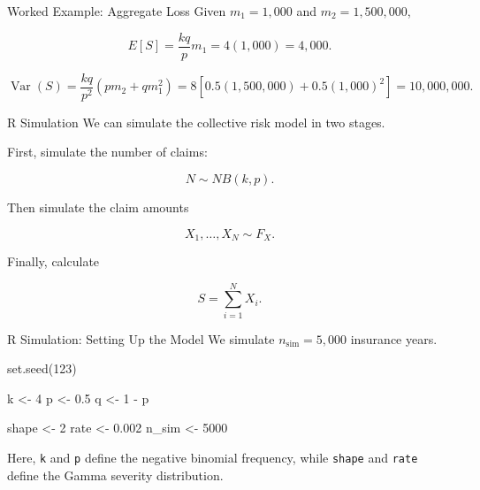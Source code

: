 \documentclass[
  ignorenonframetext,
  aspectratio=169,
]{beamer}
\newenvironment{Shaded}{\begin{snugshade}}{\end{snugshade}}
\newcommand{\DecValTok}[1]{\textcolor[rgb]{0.68,0.00,0.00}{#1}}
\newcommand{\FloatTok}[1]{\textcolor[rgb]{0.68,0.00,0.00}{#1}}
\newcommand{\FunctionTok}[1]{\textcolor[rgb]{0.28,0.35,0.67}{#1}}
\newcommand{\NormalTok}[1]{\textcolor[rgb]{0.00,0.23,0.31}{#1}}
\newcommand{\OtherTok}[1]{\textcolor[rgb]{0.00,0.23,0.31}{#1}}
\newcommand{\SpecialCharTok}[1]{\textcolor[rgb]{0.37,0.37,0.37}{#1}}
\begin{document}
\begin{frame}{Worked Example: Aggregate Loss}
\protect{}\label{worked-example-aggregate-loss}
Given \(m_1=1{,}000\) and \(m_2=1{,}500{,}000\),

\[
E[S]=\frac{kq}{p}m_1
=4(1{,}000)=4{,}000.
\]

\[
\operatorname{Var}(S)
=\frac{kq}{p^2}(pm_2+qm_1^2)
=8[0.5(1{,}500{,}000)+0.5(1{,}000)^2]
=10{,}000{,}000.
\]
\end{frame}

\begin{frame}{R Simulation}
\protect{}\label{r-simulation}
We can simulate the collective risk model in two stages.

First, simulate the number of claims:

\[
N\sim NB(k,p).
\]

Then simulate the claim amounts

\[
X_1,\ldots,X_N\sim F_X.
\]

Finally, calculate

\[
S=\sum_{i=1}^{N}X_i.
\]
\end{frame}

\begin{frame}[fragile]{R Simulation: Setting Up the Model}
\protect{}\label{r-simulation-setting-up-the-model}
We simulate \(n_{\text{sim}}=5{,}000\) insurance years.

\begin{Shaded}
\begin{Highlighting}[]
\FunctionTok{set.seed}\NormalTok{(}\DecValTok{123}\NormalTok{)}

\NormalTok{k }\OtherTok{\textless{}{-}} \DecValTok{4}
\NormalTok{p }\OtherTok{\textless{}{-}} \FloatTok{0.5}
\NormalTok{q }\OtherTok{\textless{}{-}} \DecValTok{1} \SpecialCharTok{{-}}\NormalTok{ p}

\NormalTok{shape }\OtherTok{\textless{}{-}} \DecValTok{2}
\NormalTok{rate }\OtherTok{\textless{}{-}} \FloatTok{0.002}
\NormalTok{n\_sim }\OtherTok{\textless{}{-}} \DecValTok{5000}
\end{Highlighting}
\end{Shaded}

Here, \texttt{k} and \texttt{p} define the negative binomial frequency,
while \texttt{shape} and \texttt{rate} define the Gamma severity
distribution.
\end{frame}
\end{document}
